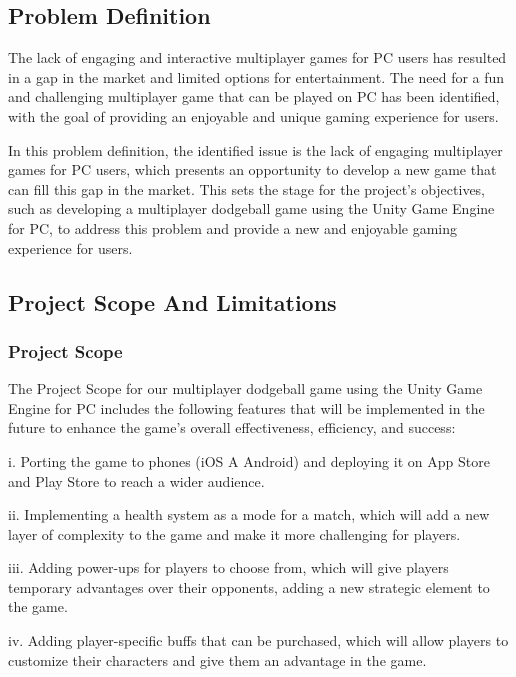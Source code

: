 \documentclass[12pt]{report}
\begin{document}
\subsection{Problem Definition}

\justifying
\setlength{\parindent}{4em}
\setlength{\parskip}{0.5em}
\renewcommand{\baselinestretch}{1.5}
\normalsize \hspace{1.7cm} The lack of engaging and interactive multiplayer games for PC users has resulted in a gap in the market and limited options for entertainment. The need for a fun and challenging multiplayer game that can be played on PC has been identified, with the goal of providing an enjoyable and unique gaming experience for users.

In this problem definition, the identified issue is the lack of engaging multiplayer games for PC users, which presents an opportunity to develop a new game that can fill this gap in the market. This sets the stage for the project's objectives, such as developing a multiplayer dodgeball game using the Unity Game Engine for PC, to address this problem and provide a new and enjoyable gaming experience for users.
\clearpage
\raggedright
\subsection{Project Scope And Limitations }
\subsubsection{Project Scope}
\justifying
\setlength{\parindent}{2em}
\setlength{\parskip}{0.5em}
\renewcommand{\baselinestretch}{1.5}
\normalsize \hspace{1.7cm} The Project Scope for our multiplayer dodgeball game using the Unity Game Engine for PC includes the following features that will be implemented in the future to enhance the game's overall effectiveness, efficiency, and success:

i. Porting the game to phones (iOS A Android) and deploying it on App Store and Play Store to reach a wider audience.

ii. Implementing a health system as a mode for a match, which will add a new layer of complexity to the game and make it more challenging for players.

iii. Adding power-ups for players to choose from, which will give players temporary advantages over their opponents, adding a new strategic element to the game.

iv. Adding player-specific buffs that can be purchased, which will allow players to customize their characters and give them an advantage in the game.
\end{document}
